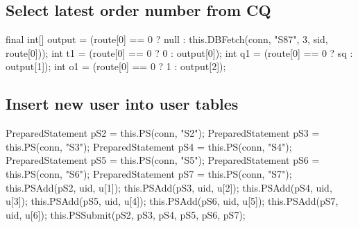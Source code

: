 \subsection{Select latest order number from CQ}
\nwenddocs{}\endmoddef{}
final int[] output = (route[0] == 0 ? null : this.DBFetch(conn, "S87", 3, sid, route[0]));
int t1 = (route[0] == 0 ?  0 : output[0]);
int q1 = (route[0] == 0 ? sq : output[1]);
int o1 = (route[0] == 0 ?  1 : output[2]);
\nwendcode{}\nwdocspar

\subsection{Insert new user into user tables}
\nwenddocs{}\endmoddef{}
PreparedStatement pS2 = this.PS(conn, "S2");
PreparedStatement pS3 = this.PS(conn, "S3");
PreparedStatement pS4 = this.PS(conn, "S4");
PreparedStatement pS5 = this.PS(conn, "S5");
PreparedStatement pS6 = this.PS(conn, "S6");
PreparedStatement pS7 = this.PS(conn, "S7");
this.PSAdd(pS2, uid, u[1]);
this.PSAdd(pS3, uid, u[2]);
this.PSAdd(pS4, uid, u[3]);
this.PSAdd(pS5, uid, u[4]);
this.PSAdd(pS6, uid, u[5]);
this.PSAdd(pS7, uid, u[6]);
this.PSSubmit(pS2, pS3, pS4, pS5, pS6, pS7);
\nwendcode{}\nwdocspar

